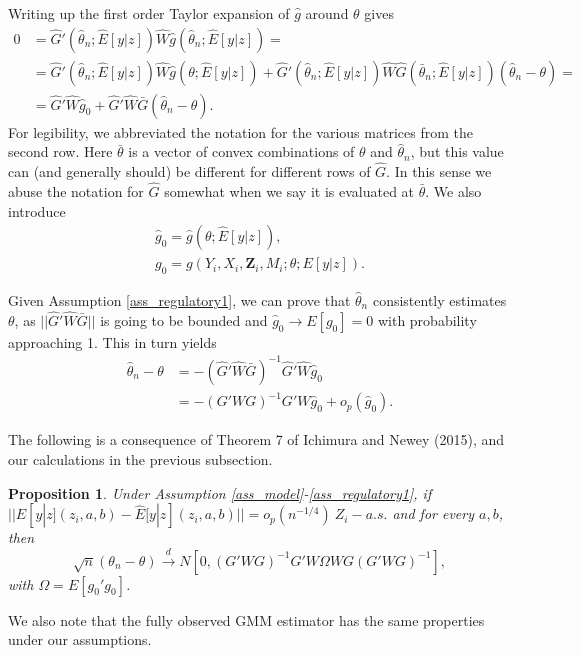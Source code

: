 \documentclass{article}
\newtheorem{proposition}{Proposition}
\theoremstyle{definition}
\theoremstyle{remark}
\begin{document}
Writing up the first order Taylor expansion of $\hat{g}$ around $\theta$ gives
\begin{align}
    0&=\hat{G}'(\hat{\theta}_n;\hat{E}[y|z])\hat{W}\hat{g}(\hat{\theta}_n;\hat{E}[y|z])= \\ &=\hat{G}'(\hat{\theta}_n;\hat{E}[y|z])\hat{W}\hat{g}(\theta;\hat{E}[y|z])+ \hat{G}'(\hat{\theta}_n;\hat{E}[y|z])\hat{W}\hat{G}(\bar{\theta}_n;\hat{E}[y|z])(\hat{\theta}_n-\theta)= \nonumber \\
    &= \hat{G}'\hat{W}\hat{g}_0+ \hat{G}'\hat{W}\bar{G}(\hat{\theta}_n-\theta). \nonumber
    \end{align}
For legibility, we abbreviated the notation for the various matrices from the second row. Here $\bar{\theta}$ is a vector of convex combinations of $\theta$ and $\hat{\theta}_n$, but this value can (and generally should) be different for different rows of $\hat{G}$. In this sense we abuse the notation for $\hat{G}$ somewhat when we say it is evaluated at $\bar{\theta}$. We also introduce
\begin{align}
\hat{g}_0=\hat{g}(\theta;\hat{E}[y|z]), \\
g_0 = g(Y_i, X_i, \mathbf{Z}_i, M_i; \theta; E[y|z]).
\end{align}

Given Assumption \ref{ass_regulatory1}, we can prove that $\hat{\theta}_n$ consistently estimates $\theta$, as $||\hat{G}'\hat{W}\bar{G}||$ is going to be bounded and $\hat{g}_0 \rightarrow E[g_0]=0$ with probability approaching 1. This in turn yields
\begin{align}
    \hat{\theta}_n -\theta&=-(\hat{G}'\hat{W}\bar{G})^{-1} \hat{G}'\hat{W} \hat{g}_0 \\
    &= -(G'WG)^{-1}G'W \hat{g}_0 + o_p(\hat{g}_0).\nonumber
\end{align}

The following is a consequence of Theorem 7 of Ichimura and Newey (2015), and our calculations in the previous subsection.
\begin{proposition}\label{prop_asympTheory}
	Under Assumption \ref{ass_model}-\ref{ass_regulatory1}, if $||E[y|z](z_i, a,b)-\hat{E}[y|z](z_i, a,b)||=o_p(n^{-1/4}) \ Z_i-a.s.$ and for every $a,b$, then
	\[\sqrt{n}(\theta_n-\theta) \stackrel{d}{\rightarrow} N[0, (G'WG)^{-1}G'W \Omega W G (G'WG)^{-1}],
	\]
	with $\Omega= E[g_0'g_0]$.
\end{proposition}
We also note that the fully observed GMM estimator has the same properties under our assumptions.
\end{document}
